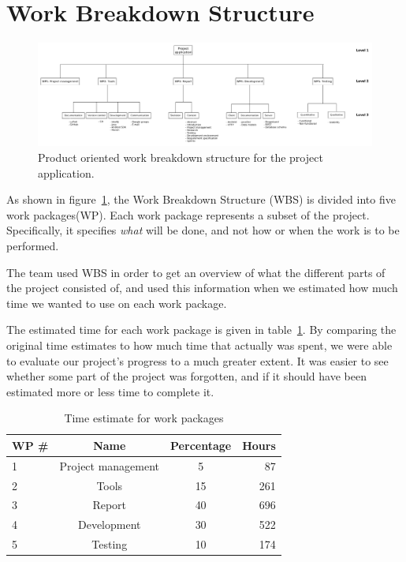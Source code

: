 \section{Work Breakdown Structure}

\begin{figure}[H]
\includegraphics[width=\textwidth]{ch/prestudy/fig/wbs.png}
\caption{Product oriented work breakdown structure for the project application.}
\label{fig:wbs}
\end{figure}

As shown in figure~\ref{fig:wbs}, the Work Breakdown Structure (WBS) is divided into five work packages(WP). Each work package represents a subset of the project. Specifically, it specifies \emph{what} will be done, and not how or when the work is to be performed.

The team used WBS in order to get an overview of what the different parts of the project consisted of, and used this information when we estimated how much time we wanted to use on each work package.

The estimated time for each work package is given in table~\ref{tab:timeEstWP}. By comparing the original time estimates to how much time that actually was spent, we were able to evaluate our project's progress to a much greater extent. It was easier to see whether some part of the project was forgotten, and if it should have been estimated more  or less time to complete it.

\begin{table}[H]
\centering
{}
\begin{tabular}{|l|c|c|r|}
\hline
    \textbf{WP \#} & \textbf{Name} & \textbf{Percentage} & \textbf{Hours} \\\hline
    1 & Project management & 5 & 87\\\hline
    2 & Tools 			   & 15 & 261\\\hline
    3 & Report 			   & 40 & 696\\\hline
    4 & Development 	   & 30 & 522\\\hline
    5 & Testing  		   & 10 & 174\\\hline
\end{tabular}
\caption{Time estimate for work packages}
\label{tab:timeEstWP}
\end{table}